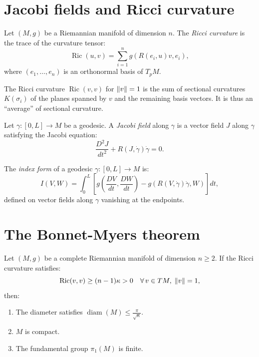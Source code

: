 \section{Jacobi fields and Ricci curvature}

\begin{definition}
Let $(M, g)$ be a Riemannian manifold of dimension $n$. The \emph{Ricci curvature}
is the trace of the curvature tensor:
\[
    \operatorname{Ric}(u, v) = \sum_{i=1}^{n} g(R(e_i, u)v, e_i),
\]
where $(e_1, \ldots, e_n)$ is an orthonormal basis of $T_pM$.
\end{definition}

\begin{remark}
The Ricci curvature $\operatorname{Ric}(v, v)$ for $\left\| v \right\| = 1$ is the sum of
sectional curvatures $K(\sigma_i)$ of the planes spanned by $v$ and the remaining
basis vectors. It is thus an ``average'' of sectional curvature.
\end{remark}

\begin{definition}
Let $\gamma : [0, L] \to M$ be a geodesic. A \emph{Jacobi field} along $\gamma$
is a vector field $J$ along $\gamma$ satisfying the Jacobi equation:
\[
    \frac{D^2 J}{dt^2} + R(J, \dot{\gamma})\dot{\gamma} = 0.
\]
\end{definition}

\begin{definition}
\label{def:index_form}
The \emph{index form} of a geodesic $\gamma : [0, L] \to M$ is:
\[
    I(V, W) = \int_0^L \left[ g\!\left(\frac{DV}{dt}, \frac{DW}{dt}\right)
    - g(R(V, \dot{\gamma})\dot{\gamma}, W) \right] dt,
\]
defined on vector fields along $\gamma$ vanishing at the endpoints.
\end{definition}

\section{The Bonnet-Myers theorem}

\begin{theorem}
\label{thm:bonnet_myers}
Let $(M, g)$ be a complete Riemannian manifold of dimension $n \geq 2$. If the
Ricci curvature satisfies:
\[
    \operatorname{Ric}(v, v) \geq (n-1)\kappa > 0
    \quad \forall\, v \in TM,\; \left\| v \right\| = 1,
\]
then:
\begin{enumerate}
    \item The diameter satisfies $\operatorname{diam}(M) \leq \frac{\pi}{\sqrt{\kappa}}$.
    \item $M$ is compact.
    \item The fundamental group $\pi_1(M)$ is finite.
\end{enumerate}
\end{theorem}

